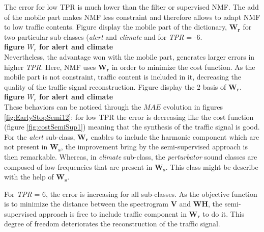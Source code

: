 \documentclass[twocolumn,a4paper,10pt]{article}
\begin{document}
The error for low TPR is much lower than the filter or supervised NMF. The add of the mobile part makes NMF less constraint and therefore allows to adapt NMF to low traffic contents. Figure display the mobile part of the dictionary, $\mathbf{W_r}$ for two particular sub-classes (\textit{alert} and \textit{climate} and for \textit{TPR} = -6.\\


\textbf{figure $W_r$ for alert and climate}\\

Nevertheless, the advantage won with the mobile part, generates larger errors in higher \textit{TPR}. Here, NMF uses $\mathbf{W_r}$ in order to minimize the cost function. As the mobile part is not constraint, traffic content is included in it, decreasing the quality of the traffic signal reconstruction. Figure display the 2 basis of $\mathbf{W_r}$. \\

\textbf{figure $W_r$ for alert and climate}\\

These behaviors can be noticed through the $MAE$ evolution in figures \ref{fig:EarlyStopSemi12}: for low TPR the error is decreasing like the cost function (figure \ref{fig:costSemiSup1}) meaning that the synthesis of the traffic signal is good. For the \textit{alert} sub-class, $\mathbf{W_r}$ enables to include the harmonic component which are not present in $\mathbf{W_s}$, the improvement bring by the semi-supervised approach is then remarkable. Whereas, in \textit{climate} sub-class, the \textit{perturbator} sound classes are composed of low-frequencies that are present in $\mathbf{W_s}$. This class might be describe with the help of $\mathbf{W_s}$.

For \textit{TPR} = 6, the error is increasing for all sub-classes. As the objective function is to minimize the distance between the spectrogram $\mathbf{V}$ and $\mathbf{WH}$, the semi-supervised approach is free to include traffic component in $\mathbf{W_r}$ to do it. This degree of freedom deteriorates the reconstruction of the traffic signal. \\
\end{document}
